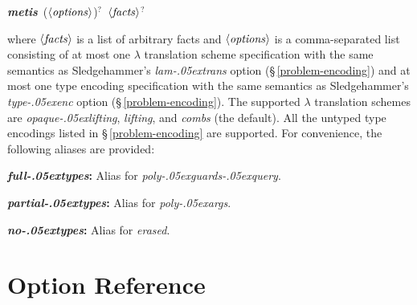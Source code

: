 \documentclass[a4paper,12pt]{article}
\let\oldS=\S
\def\S{\oldS\,}
\def\qty#1{\ensuremath{\left<\mathit{#1\/}\right>}}
\renewcommand\_{\hbox{\textunderscore\kern-.05ex}}
\begin{document}
\prew
\textbf{\textit{metis}}~(\qty{options})${}^?$~\qty{facts}${}^?$
\postw

where \qty{facts} is a list of arbitrary facts and \qty{options} is a
comma-separated list consisting of at most one $\lambda$ translation scheme
specification with the same semantics as Sledgehammer's \textit{lam\_trans}
option (\S\ref{problem-encoding}) and at most one type encoding specification
with the same semantics as Sledgehammer's \textit{type\_enc} option
(\S\ref{problem-encoding}).
%
The supported $\lambda$ translation schemes are \textit{opaque\_lifting},
\textit{lifting}, and \textit{combs} (the default).
%
All the untyped type encodings listed in \S\ref{problem-encoding} are supported.
For convenience, the following aliases are provided:
\begin{enum}
\item[\labelitemi] \textbf{\textit{full\_types}:} Alias for \textit{poly\_guards\_query}.
\item[\labelitemi] \textbf{\textit{partial\_types}:} Alias for \textit{poly\_args}.
\item[\labelitemi] \textbf{\textit{no\_types}:} Alias for \textit{erased}.
\end{enum}


\section{Option Reference}
\label{option-reference}

\def\defl{\{}
\def\defr{\}}
\end{document}
